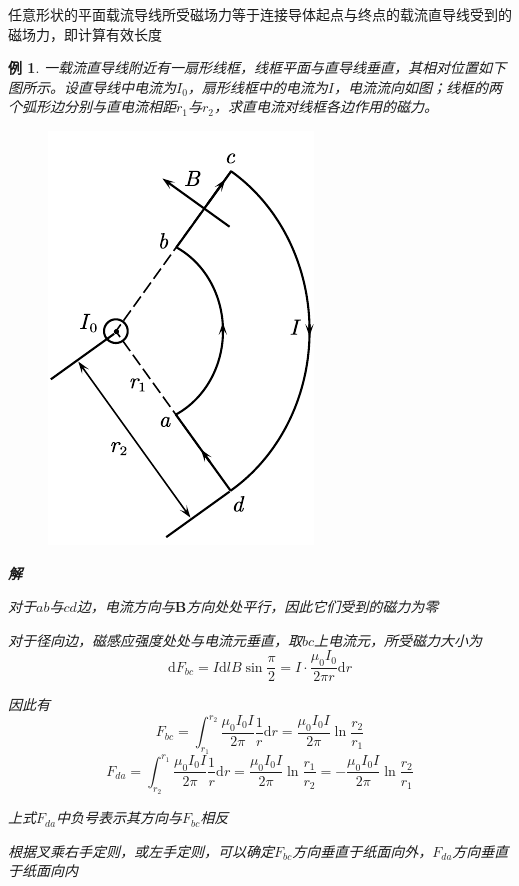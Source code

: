 \documentclass[12pt, a4paper, twoside]{ctexbook}
\newtheorem{example}[theorem]{例}
\begin{document}
任意形状的平面载流导线所受磁场力等于连接导体起点与终点的载流直导线受到的磁场力，即计算有效长度

\begin{example}
    一载流直导线附近有一扇形线框，线框平面与直导线垂直，其相对位置如下图所示。设直导线中电流为$I_0$，扇形线框中的电流为$I$，电流流向如图；线框的两个弧形边分别与直电流相距$r_1$与$r_2$，求直电流对线框各边作用的磁力。
    \begin{figure}[H]
        \centerline{\includegraphics[scale=0.8]{CH10EX06.pdf}}
    \end{figure}

    \noindent\textbf{解}

    对于$ab$与$cd$边，电流方向与$\boldsymbol{B}$方向处处平行，因此它们受到的磁力为零

    对于径向边，磁感应强度处处与电流元垂直，取$bc$上电流元，所受磁力大小为
    $$
    \mathrm{d}F_{bc}=I\mathrm{d}lB\sin\frac{\pi}{2}=I\cdot\frac{\mu_0I_0}{2\pi r}\mathrm{d}r
    $$

    因此有
    $$
    F_{bc}=\int_{r_1}^{r_2}\frac{\mu_0I_0I}{2\pi}\frac{1}{r}\mathrm{d}r=\frac{\mu_0I_0I}{2\pi}\ln\frac{r_2}{r_1}
    $$
    $$
    F_{da}=\int_{r_2}^{r_1}\frac{\mu_0I_0I}{2\pi}\frac{1}{r}\mathrm{d}r=\frac{\mu_0I_0I}{2\pi}\ln\frac{r_1}{r_2}=-\frac{\mu_0I_0I}{2\pi}\ln\frac{r_2}{r_1}
    $$
    
    上式$F_{da}$中负号表示其方向与$F_{bc}$相反

    根据叉乘右手定则，或左手定则，可以确定$F_{bc}$方向垂直于纸面向外，$F_{da}$方向垂直于纸面向内
\end{example}
\end{document}
